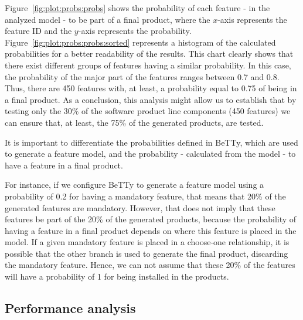 Figure~\ref{fig:plot:probs:probs} shows the probability of each feature - in the analyzed model - to
be part of a final product, where the $x$-axis
represents the feature ID and the $y$-axis represents the probability.
Figure~\ref{fig:plot:probs:probs:sorted} represents a histogram of the calculated probabilities for a better
readability of the results. This chart clearly shows that there exist
different groups of features having a similar probability. In this case, the probability of the major part
of the features ranges between 0.7 and 0.8.
%
Thus, there are 450 features with, at least, a probability equal to 0.75 of being in a final product. As a conclusion, this analysis might allow us to establish that by testing only the 30\% of the software product line components (450 features) we can ensure that, at least, the 75\% of the generated products, are tested.

It is important to differentiate the probabilities defined in BeTTy, which are used to generate a
feature model, and the probability - calculated from the model - to have a feature in a final
product.

For instance, if we configure BeTTy to generate a feature model using a probability
of 0.2 for having a mandatory feature, that means that 20\% of the generated features are mandatory.
However, that does not imply that these features be part of the 20\% of the generated products, because
the probability of having a feature in a final product depends on where this feature is placed in the
model. If a given mandatory feature is placed in a choose-one relationship, it is possible that
the other branch is used to generate the final product, discarding the mandatory feature.
Hence, we can not assume that these 20\% of the features will have a probability of 1 for being
installed in the products.



\subsection{Performance analysis}
\label{sec:stat:impl:performance:analysis}

